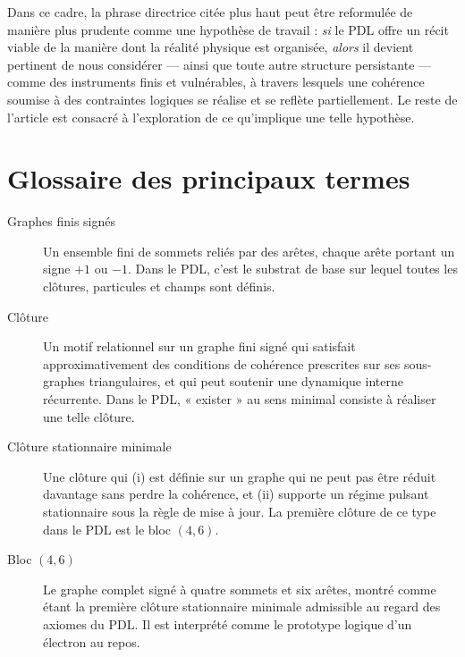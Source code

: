\documentclass[11pt,a4paper]{article}
\theoremstyle{definition}
\begin{document}
Dans ce cadre, la phrase directrice citée plus haut peut être reformulée de manière plus prudente comme une hypothèse de travail : \emph{si} le PDL offre un récit viable de la manière dont la réalité physique est organisée, \emph{alors} il devient pertinent de nous considérer — ainsi que toute autre structure persistante — comme des instruments finis et vulnérables, à travers lesquels une cohérence soumise à des contraintes logiques se réalise et se reflète partiellement. Le reste de l’article est consacré à l’exploration de ce qu’implique une telle hypothèse.

\section*{Glossaire des principaux termes}

\begin{description}

\item[Graphes finis signés]
Un ensemble fini de sommets reliés par des arêtes, chaque arête portant un signe \(+1\) ou \(-1\). Dans le PDL, c’est le substrat de base sur lequel toutes les clôtures, particules et champs sont définis.\cite{Laubscher_IntroPDL_2024,Laubscher_EmergencePhysicalReality_2024}

\item[Clôture]
Un motif relationnel sur un graphe fini signé qui satisfait approximativement des conditions de cohérence prescrites sur ses sous-graphes triangulaires, et qui peut soutenir une dynamique interne récurrente. Dans le PDL, « exister » au sens minimal consiste à réaliser une telle clôture.\cite{Laubscher_EmergencePhysicalReality_2024,Laubscher_MinimalClosures_46_2024}

\item[Clôture stationnaire minimale]
Une clôture qui (i) est définie sur un graphe qui ne peut pas être réduit davantage sans perdre la cohérence, et (ii) supporte un régime pulsant stationnaire sous la règle de mise à jour. La première clôture de ce type dans le PDL est le bloc \((4,6)\).\cite{Laubscher_MinimalClosures_46_2024}

\item[Bloc \((4,6)\)]
Le graphe complet signé à quatre sommets et six arêtes, montré comme étant la première clôture stationnaire minimale admissible au regard des axiomes du PDL. Il est interprété comme le prototype logique d’un électron au repos.\cite{Laubscher_MinimalClosures_46_2024,Laubscher_EmergencePhysicalReality_2024}


\end{description}
\end{document}
